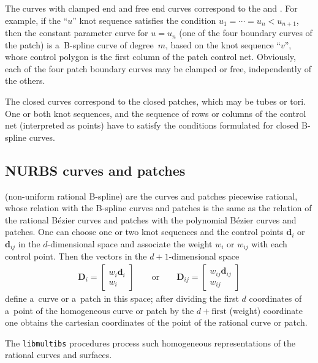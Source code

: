 The curves with clamped end and free end curves correspond to
the   and .
For example, if the ``$u$'' knot sequence satisfies the condition
$u_1=\cdots=u_n<u_{n+1}$, then the constant parameter curve for $u=u_n$ (one
of the four boundary curves of the patch) is a~B-spline curve of degree~$m$,
based on the knot sequence ``$v$'', whose control polygon is the first
column of the patch control net. Obviously, each of the four patch
boundary curves may be clamped or free, independently of the others.

The closed curves correspond to the closed patches, which may be tubes or tori.
One or both knot sequences, and the sequence of rows or columns of the control net
(interpreted as points) have to satisfy the conditions formulated for 
closed B-spline curves.


\subsection{NURBS curves and patches}

 (non-uniform rational B-spline) 
are the curves and patches piecewise rational, whose relation with the
B-spline curves and patches is the same as the relation of the rational
B\'{e}zier curves and patches with the polynomial B\'{e}zier curves and
patches. One can choose one or two knot sequences and the control points
$\bm{d}_i$ or $\bm{d}_{ij}$ in the $d$-dimensional space and associate the
weight $w_i$ or $w_{ij}$ with each control point. Then the vectors in
the $d+1$-dimensional space
\begin{align}
  \bm{D}_i =
  \left[\begin{array}{c} w_i\bm{d}_i \\ w_i \end{array}\right]
  \qquad\mbox{or}\qquad
  \bm{D}_{ij} =
  \left[\begin{array}{c} w_{ij}\bm{d}_{ij} \\ w_{ij} \end{array}\right]
\end{align}
define a~curve or a~patch in this space; after dividing the first $d$
coordinates of a~point of the homogeneous curve or patch by the
$d+\mathord{\mbox{first}}$ (weight) coordinate one obtains the cartesian
coordinates of the point of the rational curve or patch.

The \texttt{libmultibs} procedures process such homogeneous representations
of the rational curves and surfaces.


